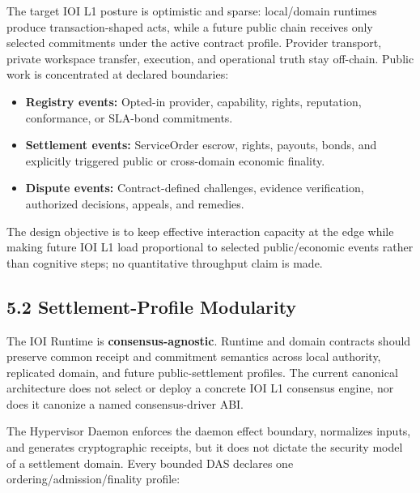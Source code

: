 \documentclass[
  11pt,
]{article}
\providecommand{\tightlist}{%
  \setlength{\itemsep}{0pt}\setlength{\parskip}{0pt}}
\begin{document}
The target IOI L1 posture is optimistic and sparse: local/domain runtimes
produce transaction-shaped acts, while a future public chain receives only
selected commitments under the active contract profile. Provider transport,
private workspace transfer, execution, and operational truth stay off-chain.
Public work is concentrated at declared boundaries:

\begin{itemize}
\tightlist
\item
  \textbf{Registry events:} Opted-in provider, capability, rights,
  reputation, conformance, or SLA-bond commitments.
\item
  \textbf{Settlement events:} ServiceOrder escrow, rights, payouts, bonds,
  and explicitly triggered public or cross-domain economic finality.
\item
  \textbf{Dispute events:} Contract-defined challenges, evidence verification,
  authorized decisions, appeals, and remedies.
\end{itemize}

The design objective is to keep effective interaction capacity at the edge
while making future IOI L1 load proportional to selected public/economic
events rather than cognitive steps; no quantitative throughput claim is made.

\hypertarget{modular-consensus-the-driver-philosophy}{%
\subsection{5.2 Settlement-Profile
Modularity}\label{modular-consensus-the-driver-philosophy}}

The IOI Runtime is \textbf{consensus-agnostic}. Runtime and domain
contracts should preserve common receipt and commitment semantics across
local authority, replicated domain, and future public-settlement profiles.
The current canonical architecture does not select or deploy a concrete IOI
L1 consensus engine, nor does it canonize a named consensus-driver ABI.

The Hypervisor Daemon enforces the daemon effect boundary, normalizes inputs,
and generates cryptographic receipts, but it does not dictate the
security model of a settlement domain. Every bounded DAS declares one
ordering/admission/finality profile:
\end{document}
